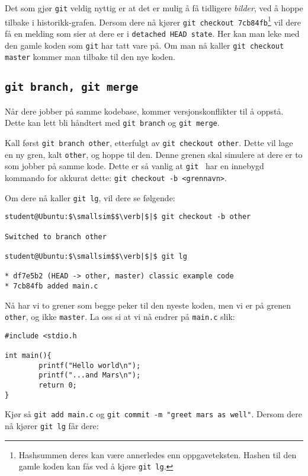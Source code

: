 \begin{alphasection}
Det som gjør \verb|git| veldig nyttig er at det er mulig å få tidligere \textit{bilder}, ved å hoppe tilbake i historikk-grafen. Dersom dere nå kjører \verb|git checkout 7cb84fb|\footnote{Hashsummen deres kan være annerledes enn oppgaveteksten. Hashen til den gamle koden kan fås ved å kjøre \texttt{git lg}.} vil dere få en melding som sier at dere er i \verb|detached HEAD state|. Her kan man leke med den gamle koden som \verb|git| har tatt vare på. Om man nå kaller \verb|git checkout master| kommer man tilbake til den nye koden.


\subsection{\texttt{git branch, git merge}}

Når dere jobber på samme kodebase, kommer versjonskonflikter til å oppstå. Dette kan lett bli håndtert med \verb|git branch| og \verb|git merge|.

Kall først \verb|git branch other|, etterfulgt av \verb|git checkout other|. Dette vil lage en ny gren, kalt \verb|other|, og hoppe til den. Denne grenen skal simulere at dere er to som jobber på samme kode. Dette er så vanlig at \verb|git | har en innebygd kommando for akkurat dette: \verb|git checkout -b <grennavn>|.

Om dere nå kaller \verb|git lg|, vil dere se følgende:

\begin{lstlisting}[mathescape=true]
student@Ubuntu:$\smallsim$$\verb|$|$ git checkout -b other

Switched to branch other

student@Ubuntu:$\smallsim$$\verb|$|$ git lg

* df7e5b2 (HEAD -> other, master) classic example code
* 7cb84fb added main.c
\end{lstlisting}

Nå har vi to grener som begge peker til den nyeste koden, men vi er på
grenen \verb|other|, og ikke \verb|master|. La oss si at vi nå endrer på \verb|main.c| slik:

\begin{lstlisting}
#include <stdio.h

int main(){
        printf("Hello world\n");
        printf("...and Mars\n");
        return 0;
}
\end{lstlisting}


Kjør så \verb|git add main.c| og \verb|git commit -m "greet mars as well"|. Dersom dere nå kjører \verb|git lg| får dere:


\end{alphasection}
